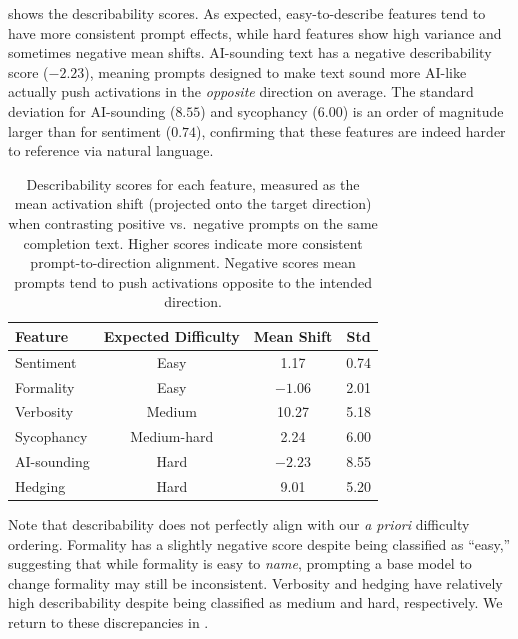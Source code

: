  shows the describability scores. As expected, easy-to-describe features tend to have more consistent prompt effects, while hard features show high variance and sometimes negative mean shifts. AI-sounding text has a negative describability score ($-2.23$), meaning prompts designed to make text sound more AI-like actually push activations in the \emph{opposite} direction on average. The standard deviation for AI-sounding ($8.55$) and sycophancy ($6.00$) is an order of magnitude larger than for sentiment ($0.74$), confirming that these features are indeed harder to reference via natural language.

\begin{table}[t]
    \centering
    \caption{Describability scores for each feature, measured as the mean activation shift (projected onto the target direction) when contrasting positive vs.\ negative prompts on the same completion text. Higher scores indicate more consistent prompt-to-direction alignment. Negative scores mean prompts tend to push activations opposite to the intended direction.}
    \begin{tabular}{@{}lccc@{}}
        \toprule
        \textbf{Feature} & \textbf{Expected Difficulty} & \textbf{Mean Shift} & \textbf{Std} \\
        \midrule
        Sentiment    & Easy        & 1.17   & 0.74 \\
        Formality    & Easy        & $-1.06$  & 2.01 \\
        Verbosity    & Medium      & 10.27  & 5.18 \\
        Sycophancy   & Medium-hard & 2.24   & 6.00 \\
        AI-sounding  & Hard        & $-2.23$  & 8.55 \\
        Hedging      & Hard        & 9.01   & 5.20 \\
        \bottomrule
    \end{tabular}
    \label{tab:describability}
\end{table}

Note that describability does not perfectly align with our \emph{a priori} difficulty ordering. Formality has a slightly negative score despite being classified as ``easy,'' suggesting that while formality is easy to \emph{name}, prompting a base model to change formality may still be inconsistent. Verbosity and hedging have relatively high describability despite being classified as medium and hard, respectively. We return to these discrepancies in .


